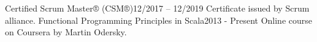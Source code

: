 %
%
%

\twocolumnsection
{
    \begin{certifications}
        \certification
    	    {Certified Scrum Master® (CSM®)}{12/2017 – 12/2019}
    	    {}
    	    {Certificate issued by Scrum alliance.}
        \certification
    	    {Functional Programming Principles in Scala}{2013 - Present}
    	    {}
    	    {Online course on Coursera by Martin Odersky.}
    \end{certifications}
}
{
    \begin{skills}
    \end{skills}
}